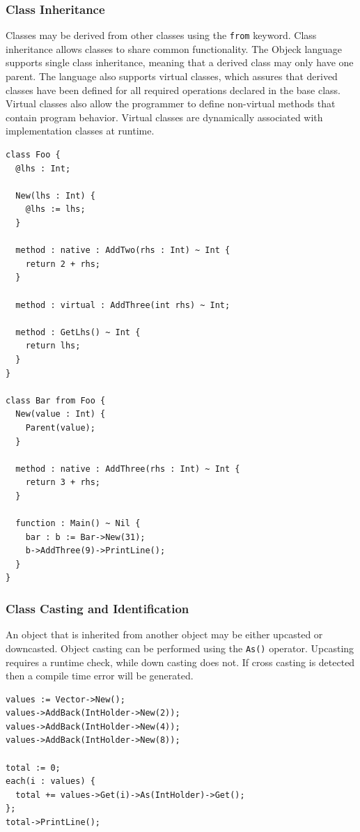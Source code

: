 \documentclass[11pt]{article}
\begin{document}
\subsubsection{Class Inheritance}
Classes may be derived from other classes using the \texttt{from}
keyword.  Class inheritance allows classes to share common
functionality.  The Objeck language supports single class inheritance,
meaning that a derived class may only have one parent.  The language
also supports virtual classes, which assures that derived classes have
been defined for all required operations declared in the base class.
Virtual classes also allow the programmer to define non-virtual
methods that contain program behavior.  Virtual classes are
dynamically associated with implementation classes at runtime.
\begin{verbatim}
class Foo {
  @lhs : Int;

  New(lhs : Int) {
    @lhs := lhs;
  }

  method : native : AddTwo(rhs : Int) ~ Int {
    return 2 + rhs;
  }

  method : virtual : AddThree(int rhs) ~ Int;

  method : GetLhs() ~ Int {
    return lhs;
  }
}

class Bar from Foo {
  New(value : Int) {
    Parent(value);
  }

  method : native : AddThree(rhs : Int) ~ Int {
    return 3 + rhs;
  }

  function : Main() ~ Nil {
    bar : b := Bar->New(31);
    b->AddThree(9)->PrintLine();
  }
}
\end{verbatim}

\subsubsection{Class Casting and Identification}
An object that is inherited from another object may be either upcasted
or downcasted.  Object casting can be performed using the
\texttt{As()} operator.  Upcasting requires a runtime check, while
down casting does not. If cross casting is detected then a compile
time error will be generated.

\begin{verbatim}
values := Vector->New();
values->AddBack(IntHolder->New(2));
values->AddBack(IntHolder->New(4));
values->AddBack(IntHolder->New(8));

total := 0;
each(i : values) {
  total += values->Get(i)->As(IntHolder)->Get();
};
total->PrintLine();
\end{verbatim}
\end{document}
